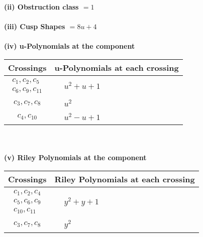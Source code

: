 \documentclass[1p]{elsarticle_modified}
\theoremstyle{definition}
\begin{document}
\flushleft \textbf{(ii) Obstruction class $= 1$}\\~\\
\flushleft \textbf{(iii) Cusp Shapes $= 8 u+4$}\\~\\
\newpage\renewcommand{\arraystretch}{1}
\flushleft \textbf{(iv) u-Polynomials at the component}\newline \\
\begin{tabular}{m{50pt}|m{274pt}}
Crossings & \hspace{64pt}u-Polynomials at each crossing \\
\hline $$\begin{aligned}c_{1},c_{2},c_{5}\\c_{6},c_{9},c_{11}\end{aligned}$$&$\begin{aligned}
&u^2+u+1
\end{aligned}$\\
\hline $$\begin{aligned}c_{3},c_{7},c_{8}\end{aligned}$$&$\begin{aligned}
&u^2
\end{aligned}$\\
\hline $$\begin{aligned}c_{4},c_{10}\end{aligned}$$&$\begin{aligned}
&u^2- u+1
\end{aligned}$\\
\hline
\end{tabular}\\~\\
\newpage\renewcommand{\arraystretch}{1}
\flushleft \textbf{(v) Riley Polynomials at the component}\newline \\
\begin{tabular}{m{50pt}|m{274pt}}
Crossings & \hspace{64pt}Riley Polynomials at each crossing \\
\hline $$\begin{aligned}c_{1},c_{2},c_{4}\\c_{5},c_{6},c_{9}\\c_{10},c_{11}\end{aligned}$$&$\begin{aligned}
&y^2+y+1
\end{aligned}$\\
\hline $$\begin{aligned}c_{3},c_{7},c_{8}\end{aligned}$$&$\begin{aligned}
&y^2
\end{aligned}$\\
\hline
\end{tabular}\\~\\
\end{document}
